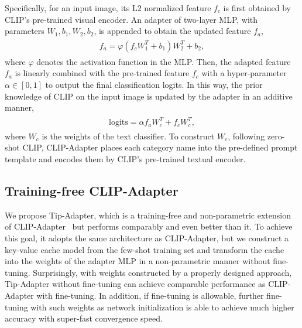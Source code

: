 \documentclass[10pt,twocolumn,letterpaper]{article}
\begin{document}
Specifically, for an input image, its L2 normalized feature $f_c$ is first obtained by CLIP's pre-trained visual encoder. An adapter of two-layer MLP, with parameters $W_1, b_1, W_2, b_2$, is appended to obtain the updated feature $f_a$,
\begin{align}
\begin{split}
    f_a = \varphi(f_c W_1^T + b_1) W_2^T + b_2,
\end{split}
\end{align}
where $\varphi$ denotes the activation function in the MLP. Then, the adapted feature $f_a$ is linearly combined with the pre-trained feature $f_c$ with a hyper-parameter $\alpha \in [0,1]$ to output the final classification logits. In this way, the prior knowledge of CLIP on the input image is updated by the adapter in an additive manner,
\begin{align}
\label{v1}
\begin{split}
    \mathrm{logits} = \alpha f_a W_c^T + f_c W_c^T,
\end{split}
\end{align}
where $W_c$ is the weights of the text classifier. To construct $W_c$, following zero-shot CLIP, CLIP-Adapter places each category name into the pre-defined prompt template and encodes them by CLIP's pre-trained textual encoder.





\subsection{Training-free CLIP-Adapter}
\label{tip}

We propose Tip-Adapter, which is a training-free and non-parametric extension of CLIP-Adapter~\cite{gao2021clip} but performs comparably and even better than it. To achieve this goal, it adopts the same architecture as CLIP-Adapter, but we
construct a key-value cache model from the few-shot training set and transform the cache into the weights of the adapter MLP in a non-parametric manner without fine-tuning. 
Surprisingly, with weights constructed by a properly designed approach, Tip-Adapter without fine-tuning can achieve comparable performance as CLIP-Adapter with fine-tuning.
In addition, if fine-tuning is allowable, further fine-tuning with such weights as network initialization is able to achieve much higher accuracy with super-fast convergence speed.
\end{document}
